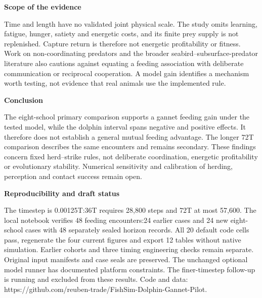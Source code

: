 \documentclass[10pt,a4paper]{article}
\begin{document}
\begin{minipage}[t]{238.10999999999999pt}\vspace{0pt}
\textbf{Scope of the evidence}\par Time and length have no validated joint physical scale. The study omits learning, fatigue, hunger, satiety and energetic costs, and its finite prey supply is not replenished. Capture return is therefore not energetic profitability or fitness. Work on non-coordinating predators \citep{mohapatra2025} and the broader seabird--subsurface-predator literature \citep{licht2026} also cautions against equating a feeding association with deliberate communication or reciprocal cooperation. A model gain identifies a mechanism worth testing, not evidence that real animals use the implemented rule.\par\smallskip
\textbf{Conclusion}\par The eight-school primary comparison supports a gannet feeding gain under the tested model, while the dolphin interval spans negative and positive effects. It therefore does not establish a general mutual feeding advantage. The longer 72T comparison describes the same encounters and remains secondary. These findings concern fixed herd--strike rules, not deliberate coordination, energetic profitability or evolutionary stability. Numerical sensitivity and calibration of herding, perception and contact success remain open.\par\smallskip
\textbf{Reproducibility and draft status}\par The timestep is 0.00125T:36T requires 28,800 steps and 72T at most 57,600. The local notebook verifies 48 feeding encounters:24 earlier cases and 24 new eight-school cases with 48 separately sealed horizon records. All 20 default code cells pass, regenerate the four current figures and export 12 tables without native simulation. Earlier cohorts and three timing engineering checks remain separate. Original input manifests and case seals are preserved. The unchanged optional model runner has documented platform constraints. The finer-timestep follow-up is running and excluded from these results. Code and data: https://github.com/reuben-trade/FishSim-Dolphin-Gannet-Pilot.\par\smallskip
\end{minipage}
\twocolumn
\end{document}

